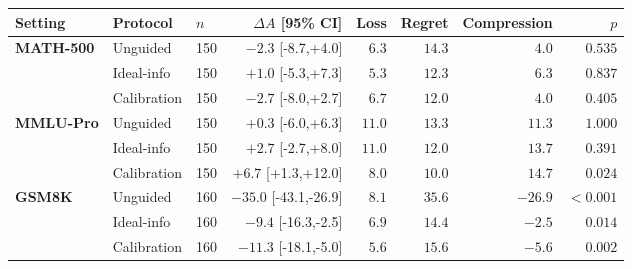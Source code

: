 \begin{table}[htbp]
\begin{tabular}{lllrrrrr}
\rowcolor{tablehead}
Setting & Protocol & $n$ & $\Delta A$ [95\% CI] & Loss & Regret & Compression & $p$ \\
\midrule
\textbf{MATH-500} & Unguided & 150 & $-2.3$ [-8.7,+4.0] & $6.3$ & $14.3$ & $4.0$ & $0.535$ \\
 & Ideal-info & 150 & $+1.0$ [-5.3,+7.3] & $5.3$ & $12.3$ & $6.3$ & $0.837$ \\
 & Calibration & 150 & $-2.7$ [-8.0,+2.7] & $6.7$ & $12.0$ & $4.0$ & $0.405$ \\
\midrule
\textbf{MMLU-Pro} & Unguided & 150 & $+0.3$ [-6.0,+6.3] & $11.0$ & $13.3$ & $11.3$ & $1.000$ \\
 & Ideal-info & 150 & $+2.7$ [-2.7,+8.0] & $11.0$ & $12.0$ & $13.7$ & $0.391$ \\
 & Calibration & 150 & $+6.7$ [+1.3,+12.0] & $8.0$ & $10.0$ & $14.7$ & $0.024$ \\
\midrule
\textbf{GSM8K} & Unguided & 160 & $-35.0$ [-43.1,-26.9] & $8.1$ & $35.6$ & $-26.9$ & $<0.001$ \\
 & Ideal-info & 160 & $-9.4$ [-16.3,-2.5] & $6.9$ & $14.4$ & $-2.5$ & $0.014$ \\
 & Calibration & 160 & $-11.3$ [-18.1,-5.0] & $5.6$ & $15.6$ & $-5.6$ & $0.002$ \\
\bottomrule
\end{tabular}
\fi
\endgroup

\end{table}
